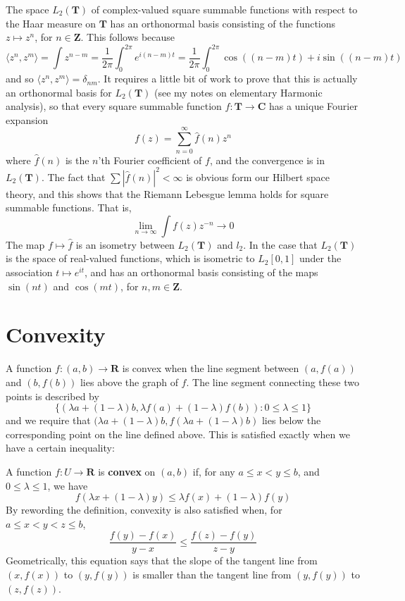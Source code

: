\begin{example}
    The space $L_2(\mathbf{T})$ of complex-valued square summable functions with respect to the Haar measure on $\mathbf{T}$ has an orthonormal basis consisting of the functions $z \mapsto z^n$, for $n \in \mathbf{Z}$. This follows because
    \[ \langle z^n, z^m \rangle = \int z^{n-m} = \frac{1}{2 \pi} \int_0^{2\pi} e^{i (n-m)t} = \frac{1}{2\pi} \int_0^{2\pi} \cos((n-m)t) + i \sin((n - m)t) \]
    and so $\langle z^n, z^m \rangle = \delta_{nm}$. It requires a little bit of work to prove that this is actually an orthonormal basis for $L_2(\mathbf{T})$ (see my notes on elementary Harmonic analysis), so that every square summable function $f: \mathbf{T} \to \mathbf{C}$ has a unique Fourier expansion
    \[ f(z) = \sum_{n = 0}^\infty \widehat{f}(n) z^n \]
    where $\widehat{f}(n)$ is the $n$'th Fourier coefficient of $f$, and the convergence is in $L_2(\mathbf{T})$. The fact that $\sum |\widehat{f}(n)|^2 < \infty$ is obvious form our Hilbert space theory, and this shows that the Riemann Lebesgue lemma holds for square summable functions. That is,
    \[ \lim_{n \to \infty} \int f(z) z^{-n} \to 0 \]
    The map $f \mapsto \widehat{f}$ is an isometry between $L_2(\mathbf{T})$ and $l_2$. In the case that $L_2(\mathbf{T})$ is the space of real-valued functions, which is isometric to $L_2[0,1]$ under the association $t \mapsto e^{it}$, and has an orthonormal basis consisting of the maps $\sin(nt)$ and $\cos(mt)$, for $n,m \in \mathbf{Z}$.
\end{example}

\section{Convexity}

A function $f:(a,b) \to \mathbf{R}$ is convex when the line segment between $(a,f(a))$ and $(b,f(b))$ lies above the graph of $f$. The line segment connecting these two points is described by
%
\[ \{ (\lambda a + (1 - \lambda) b, \lambda f(a) + (1 - \lambda) f(b)) : 0 \leq \lambda \leq 1 \} \]
%
and we require that $(\lambda a + (1 - \lambda)b, f(\lambda a + (1 - \lambda)b)$ lies below the corresponding point on the line defined above. This is satisfied exactly when we have a certain inequality:

\begin{definition}
    A function $f:U \to \mathbf{R}$ is {\bf convex} on $(a,b)$ if, for any $a \leq x < y \leq b$, and $0 \leq \lambda \leq 1$, we have
    \begin{equation} \label{convex1} f(\lambda x + (1 - \lambda) y) \leq \lambda f(x) + (1 - \lambda) f(y) \end{equation}
    By rewording the definition, convexity is also satisfied when, for $a \leq x < y < z \leq b$,
    \begin{equation} \label{convex2} \frac{f(y) - f(x)}{y - x} \leq \frac{f(z) - f(y)}{z - y} \end{equation}
    Geometrically, this equation says that the slope of the tangent line from $(x, f(x))$ to $(y, f(y))$ is smaller than the tangent line from $(y, f(y))$ to $(z, f(z))$.
\end{definition}

